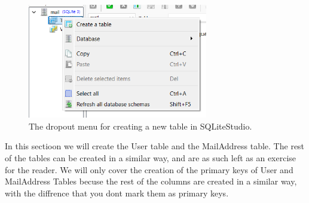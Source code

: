 \documentclass[a4paper,11pt,oneside]{article}
\begin{document}
\begin{sloppypar}
\begin{figure}[!htb]
  \centering
  \includegraphics[width=0.7\textwidth]{sqlitestudio/create_table/create_table_right_clicked.png}
  \caption{The dropout menu for creating a new table in SQLiteStudio.}
  \label{fig:createTableRightClick}
\end{figure}
In this sectioon we will create the User table and the MailAddress table. The rest of the tables can be created in a similar way, and are as such left as an exercise for the reader. We will only cover the creation of the primary keys of User and MailAddress Tables becuse the rest of the columns are created in a similar way, with the diffrence that you dont mark them as primary keys.



\end{sloppypar}
\end{document}
